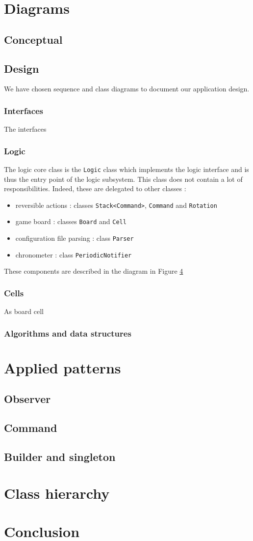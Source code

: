 \documentclass[a4paper,11pt]{article}
\begin{document}
\section{Diagrams}
\label{sec:diagrams}
\subsection{Conceptual}
\subsection{Design}
We have chosen sequence and class diagrams to document our application design. 
\subsubsection{Interfaces}
The interfaces 
\subsubsection{Logic}
The logic core class is the \texttt{Logic} class which implements the logic interface and is thus the entry point of the logic subsystem. This class does not contain a lot of responsibilities. Indeed, these are delegated to other classes : 
\begin{itemize}
	\item reversible actions : classes \texttt{Stack<Command>}, \texttt{Command} and \texttt{Rotation} 
	\item game board : classes \texttt{Board} and \texttt{Cell}
	\item configuration file parsing : class \texttt{Parser}
	\item chronometer : class \texttt{PeriodicNotifier}
\end{itemize}
These components are described in the diagram in Figure \ref{}
\subsubsection{Cells}
As board cell
\subsubsection{Algorithms and data structures}
\section{Applied patterns}
\subsection{Observer}
\subsection{Command}
\subsection{Builder and singleton}
\label{sec:patterns}
\section{Class hierarchy}
\label{sec:cls_hier}
\section{Conclusion}
\end{document}
